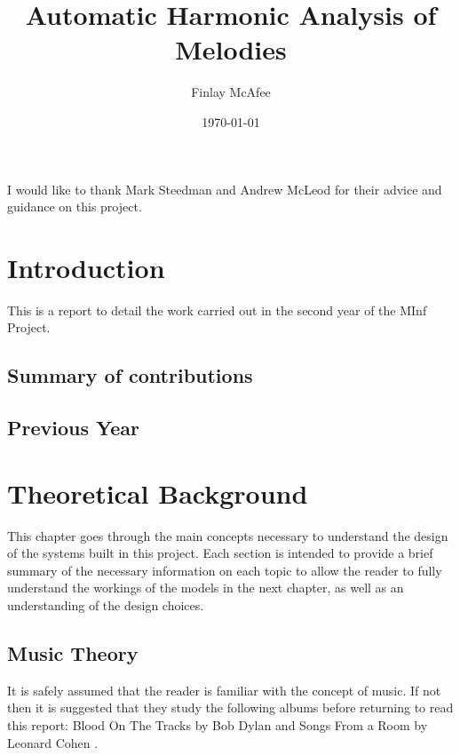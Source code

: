 \documentclass[bsc,singlespacing,logo, parskip, deptreport]{infthesis}
\begin{document}
\title{Automatic Harmonic Analysis of Melodies}

\author{Finlay McAfee}


\date{\today}

\abstract{
}

\maketitle
\begin{acknowledgements}
I would like to thank Mark Steedman and Andrew McLeod for their advice and guidance on this project.
\end{acknowledgements}
\standarddeclaration
\tableofcontents


\chapter{Introduction}
This is a report to detail the work carried out in the second year of the MInf Project.

\section{Summary of contributions}

\section{Previous Year}


\chapter{Theoretical Background}
This chapter goes through the main concepts necessary to understand the design of the systems built in this project. Each section is intended to provide a brief summary of the necessary information on each topic to allow the reader to fully understand the workings of the models in the next chapter, as well as an understanding of the design choices.

\section{Music Theory}
It is safely assumed that the reader is familiar with the concept of music. If not then it is suggested that they study the following albums before returning to read this report: Blood On The Tracks by Bob Dylan \cite{dylan1975blood} and Songs From a Room by Leonard Cohen \cite{cohen2007songs}.
\end{document}
